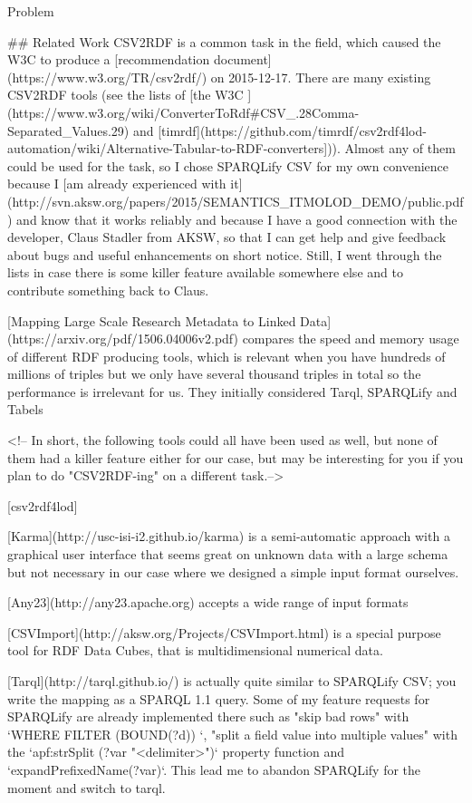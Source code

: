 \documentclass{beamer}
\begin{document}
\begin{frame}{Problem}
\begin{frame}{}
\begin{frame}{}
## Related Work
CSV2RDF is a common task in the field, which caused the W3C to produce a [recommendation document](https://www.w3.org/TR/csv2rdf/) on 2015-12-17.
There are many existing CSV2RDF tools  (see the lists of [the W3C ](https://www.w3.org/wiki/ConverterToRdf#CSV_.28Comma-Separated_Values.29) and
[timrdf](https://github.com/timrdf/csv2rdf4lod-automation/wiki/Alternative-Tabular-to-RDF-converters])). Almost any of them could be used for the task, so I chose SPARQLify CSV for my own convenience because I [am already experienced with it](http://svn.aksw.org/papers/2015/SEMANTICS_ITMOLOD_DEMO/public.pdf) and know that it works reliably and because I have a good connection with the developer, Claus Stadler from AKSW, so that I can get help and give feedback about bugs and useful enhancements on short notice. Still, I went through the lists in case there is some killer feature available somewhere else and to contribute something back to Claus.

[Mapping Large Scale Research Metadata to Linked Data](https://arxiv.org/pdf/1506.04006v2.pdf) compares the speed and memory usage of different RDF producing tools, which is relevant when you have hundreds of millions of triples but we only have several thousand triples in total so the performance is irrelevant for us.
They initially considered Tarql, SPARQLify and Tabels 

<!--
In short, the following tools could all have been used as well, but none of them had a killer feature either for our case, but may be interesting for you if
you plan to do "CSV2RDF-ing" on a different task.-->

[csv2rdf4lod]

[Karma](http://usc-isi-i2.github.io/karma) is a semi-automatic approach with a graphical user interface that seems great on unknown data with a large schema but not necessary in our case where we designed a simple input format ourselves.

[Any23](http://any23.apache.org) accepts a wide range of input formats

[CSVImport](http://aksw.org/Projects/CSVImport.html) is a special purpose tool for RDF Data Cubes, that is multidimensional numerical data.

[Tarql](http://tarql.github.io/) is actually quite similar to SPARQLify CSV; you write the mapping as a SPARQL 1.1 query. Some of my feature requests for SPARQLify are already implemented there such as "skip bad rows" with `WHERE { FILTER (BOUND(?d)) }`, "split a field value into multiple values" with the `apf:strSplit (?var "<delimiter>")` property function and `expandPrefixedName(?var)`. This lead me to abandon SPARQLify for the moment and switch to tarql. 


\end{frame}
\end{frame}
\end{frame}
\end{document}
